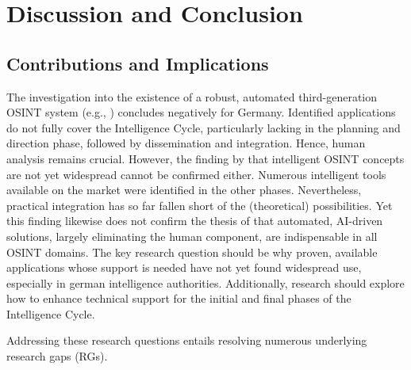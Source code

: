 \documentclass[10pt]{article}
\begin{document}
\section{Discussion and Conclusion} \label{sec:discussion}
\subsection{Contributions and Implications}

The investigation into the existence of a robust, automated third-generation OSINT system (e.g., \cite{Ghioni.2023}) concludes negatively for Germany. Identified applications do not fully cover the Intelligence Cycle, particularly lacking in the planning and direction phase, followed by dissemination and integration. Hence, human analysis remains crucial. However, the finding by \cite{PastorGalindo.2020} that intelligent OSINT
concepts are not yet widespread cannot be confirmed either. Numerous intelligent tools available
on the market were identified in the other phases. Nevertheless, practical integration has so far
fallen short of the (theoretical) possibilities. Yet this finding likewise does not confirm the
thesis of \cite{Yogish.2021} that automated, AI-driven solutions, largely eliminating
the human component, are indispensable in all OSINT domains. The key research
question should be why proven, available applications whose support is needed have not
yet found widespread use, especially in german intelligence authorities. Additionally, research should explore how to enhance technical support for the initial and final phases of the Intelligence Cycle.

Addressing these research questions entails resolving numerous underlying research gaps (RGs).%
\end{document}
